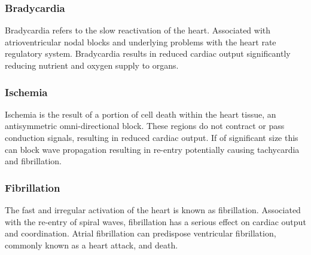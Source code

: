 \subsubsection{Bradycardia}
Bradycardia refers to the slow reactivation of the heart. Associated with atrioventricular nodal blocks and underlying problems with the heart rate regulatory system. Bradycardia results in reduced cardiac output significantly reducing nutrient and oxygen supply to organs.
\subsubsection{Ischemia}
Ischemia is the result of a portion of cell death within the heart tissue, an antisymmetric omni-directional block. These regions do not contract or pass conduction signals, resulting in reduced cardiac output. If of significant size this can block wave propagation resulting in re-entry potentially causing tachycardia and fibrillation.
\subsubsection{Fibrillation}
The fast and irregular activation of the heart is known as fibrillation. Associated with the re-entry of spiral waves, fibrillation has a serious effect on cardiac output and coordination. Atrial fibrillation can predispose ventricular fibrillation, commonly known as a heart attack, and death.
